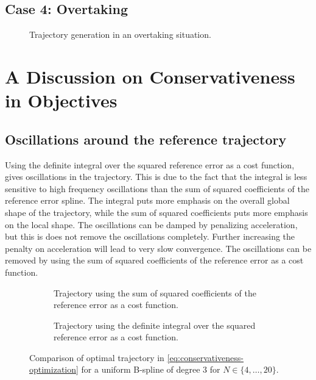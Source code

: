\subsection{Case 4: Overtaking}
\label{sec:case-4-overtaking}
\begin{figure}
    \centering
    
    \caption{Trajectory generation in an overtaking situation.}
    \label{fig:overtaking}
\end{figure}

\section{A Discussion on Conservativeness in Objectives}

\subsection{Oscillations around the reference trajectory}
\label{sec:oscillations}
Using the definite integral over the squared reference error as a cost function, gives oscillations in the trajectory. This is due to the fact that the integral is less sensitive to high frequency oscillations than the sum of squared coefficients of the reference error spline. The integral puts more emphasis on the overall global shape of the trajectory, while the sum of squared coefficients puts more emphasis on the local shape. The oscillations can be damped by penalizing acceleration, but this is does not remove the oscillations completely. Further increasing the penalty on acceleration will lead to very slow convergence.
The oscillations can be removed by using the sum of squared coefficients of the reference error as a cost function.


\begin{figure}
    \centering
    \begin{subfigure}[b]{\textwidth}
        \centering
        
        \caption{Trajectory using the sum of squared coefficients of the reference error as a cost function.}
        \label{fig:conservativeness-traj-coeffs}
    \end{subfigure}
    \hfill
    \begin{subfigure}[b]{\textwidth}
        \centering
        
        \caption{Trajectory using the definite integral over the squared reference error as a cost function.}
        \label{fig:conservativeness-traj-integral}
    \end{subfigure}
    \caption{Comparison of optimal trajectory in \cref{eq:conservativeness-optimization} for a uniform B-spline of degree 3 for $N\in\{4,\ldots,20\}$.
    }
    \label{fig:conservativeness-traj}
\end{figure}

